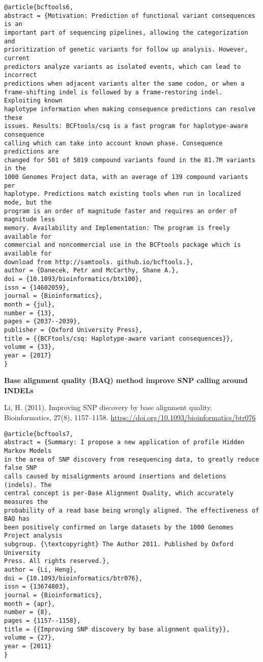 \documentclass[]{article}
\begin{document}
\begin{verbatim}
@article{bcftools6,
abstract = {Motivation: Prediction of functional variant consequences is an
important part of sequencing pipelines, allowing the categorization and
prioritization of genetic variants for follow up analysis. However, current
predictors analyze variants as isolated events, which can lead to incorrect
predictions when adjacent variants alter the same codon, or when a
frame-shifting indel is followed by a frame-restoring indel. Exploiting known
haplotype information when making consequence predictions can resolve these
issues. Results: BCFtools/csq is a fast program for haplotype-aware consequence
calling which can take into account known phase. Consequence predictions are
changed for 501 of 5019 compound variants found in the 81.7M variants in the
1000 Genomes Project data, with an average of 139 compound variants per
haplotype. Predictions match existing tools when run in localized mode, but the
program is an order of magnitude faster and requires an order of magnitude less
memory. Availability and Implementation: The program is freely available for
commercial and noncommercial use in the BCFtools package which is available for
download from http://samtools. github.io/bcftools.},
author = {Danecek, Petr and McCarthy, Shane A.},
doi = {10.1093/bioinformatics/btx100},
issn = {14602059},
journal = {Bioinformatics},
month = {jul},
number = {13},
pages = {2037--2039},
publisher = {Oxford University Press},
title = {{BCFtools/csq: Haplotype-aware variant consequences}},
volume = {33},
year = {2017}
}
\end{verbatim}

\textbf{Base alignment quality (BAQ) method improve SNP calling around INDELs}


Li, H. (2011). Improving SNP discovery by base alignment quality. Bioinformatics, 27(8), 1157–1158. \url{https://doi.org/10.1093/bioinformatics/btr076}

\begin{verbatim}
@article{bcftools7,
abstract = {Summary: I propose a new application of profile Hidden Markov Models
in the area of SNP discovery from resequencing data, to greatly reduce false SNP
calls caused by misalignments around insertions and deletions (indels). The
central concept is per-Base Alignment Quality, which accurately measures the
probability of a read base being wrongly aligned. The effectiveness of BAQ has
been positively confirmed on large datasets by the 1000 Genomes Project analysis
subgroup. {\textcopyright} The Author 2011. Published by Oxford University
Press. All rights reserved.},
author = {Li, Heng},
doi = {10.1093/bioinformatics/btr076},
issn = {13674803},
journal = {Bioinformatics},
month = {apr},
number = {8},
pages = {1157--1158},
title = {{Improving SNP discovery by base alignment quality}},
volume = {27},
year = {2011}
}
\end{verbatim}
\end{document}
